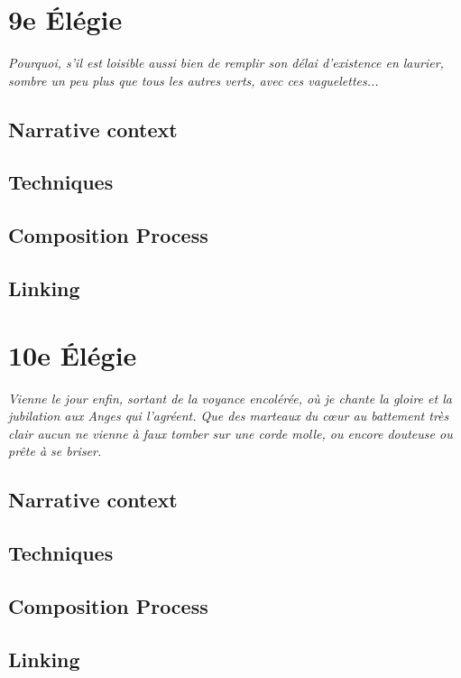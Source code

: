 \documentclass[12pt,twoside,maitrise]{dms_ks}
\theoremstyle{definition}
\begin{document}
\section{9e Élégie}

\epigraph{\textit{Pourquoi, s’il est loisible aussi bien de remplir son délai d’existence en laurier, sombre un peu plus que tous les autres verts, avec ces vaguelettes...}}{}

\subsection{Narrative context}

\subsection{Techniques}

\subsection{Composition Process}

\subsection{Linking}

\section{10e Élégie}

\epigraph{\textit{Vienne le jour enfin, sortant de la voyance encolérée, où je chante la gloire et la jubilation aux Anges qui l’agréent. Que des marteaux du cœur au battement très clair aucun ne vienne à faux tomber sur une corde molle, ou encore douteuse ou prête à se briser.}}{}

\subsection{Narrative context}

\subsection{Techniques}

\subsection{Composition Process}

\subsection{Linking}
\end{document}
